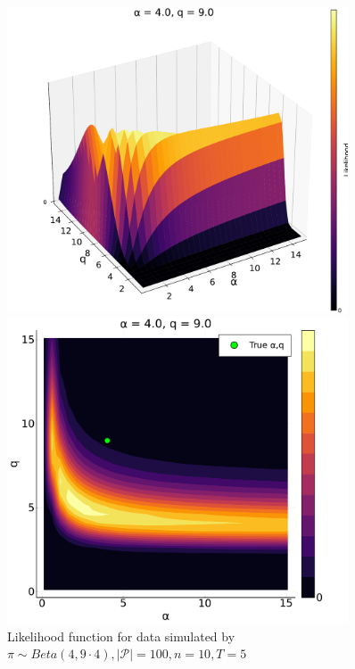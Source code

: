 \documentclass[a4paper, 12pt]{article}
\begin{document}
\begin{figure}
    \centering
    \begin{minipage}{0.55\textwidth}
        \centering
        \includegraphics[width=0.9\textwidth]{../figures/Likelihood_sfplt_4.0.pdf} %
    \end{minipage}\hfill
    \begin{minipage}{0.45\textwidth}
        \centering
        \includegraphics[width=0.9\textwidth]{../figures/Likelihood_contplt_4.0.pdf} %
    \end{minipage}
    \caption{\small \small Likelihood function for data simulated by $\pi \sim Beta(4, 9 \cdot 4), |\mathcal{P}| = 100, n = 10, T = 5$}
\end{figure}
\end{document}
